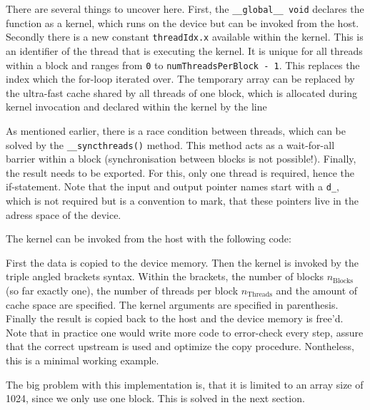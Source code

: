 

There are several things to uncover here. First, the \texttt{\_\_global\_\_ void} declares the function as a kernel, which runs on the device but can be invoked from the host. 
Secondly there is a new constant \texttt{threadIdx.x} available within the kernel.
This is an identifier of the thread that is executing the kernel.
It is unique for all threads within a block and ranges from \texttt{0} to \texttt{numThreadsPerBlock - 1}.
This replaces the index which the for-loop iterated over.
The temporary array can be replaced by the ultra-fast cache shared by all threads of one block, which is allocated during kernel invocation and declared within the kernel by the line

\lstset{firstnumber = 5}

\lstset{firstnumber = 1}

As mentioned earlier, there is a race condition between threads, which can be solved by the \texttt{\_\_syncthreads()} method.
This method acts as a wait-for-all barrier within a block (synchronisation between blocks is not possible!).
Finally, the result needs to be exported.
For this, only one thread is required, hence the if-statement.
Note that the input and output pointer names start with a \texttt{d\_}, which is not required but is a convention to mark, that these pointers live in the adress space of the device.

The kernel can be invoked from the host with the following code:



First the data is copied to the device memory.
Then the kernel is invoked by the triple angled brackets syntax.
Within the brackets, the number of blocks \( n_\mathrm{Blocks} \) (so far exactly one), the number of threads per block \( n_{\mathrm{Threads}} \) and the amount of cache space are specified.
The kernel arguments are specified in parenthesis.
Finally the result is copied back to the host and the device memory is free'd.
Note that in practice one would write more code to error-check every step, assure that the correct upstream is used and optimize the copy procedure.
Nontheless, this is a minimal working example.

The big problem with this implementation is, that it is limited to an array size of 1024, since we only use one block.
This is solved in the next section.


